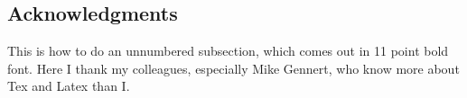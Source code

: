 \subsection*{Acknowledgments}
This is how to do an unnumbered subsection, which comes 
out in 11 point bold font.  Here I thank my colleagues, 
especially Mike Gennert, who know more about Tex and 
Latex than I.


